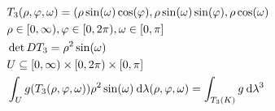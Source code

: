 \documentclass[skript.tex]{subfiles}
\begin{document}
	\begin{bsp*}
		\begin{align*}
	&	T_3(\rho,\varphi,\omega) = 	(\rho\sin(\omega)\cos(\varphi),\rho\sin(\omega)\sin(\varphi),\rho\cos(\omega) \\
	& \rho\in [0,\infty), \varphi \in [0,2\pi), \omega \in [0, \pi] \\
	& \det DT_3 = \rho^2\sin(\omega) \\
	& U \subseteq [0, \infty) \times [0,2\pi) \times [0, \pi] \\
	& \int_U g( T_3 (\rho,\varphi,\omega)) \rho^2 \sin(\omega) \: \mathrm{d} \lambda (\rho,\varphi,\omega) = \int_{T_3(K)} g \: \mathrm{d} \lambda^3
		\end{align*}
	\end{bsp*}
\end{document}

